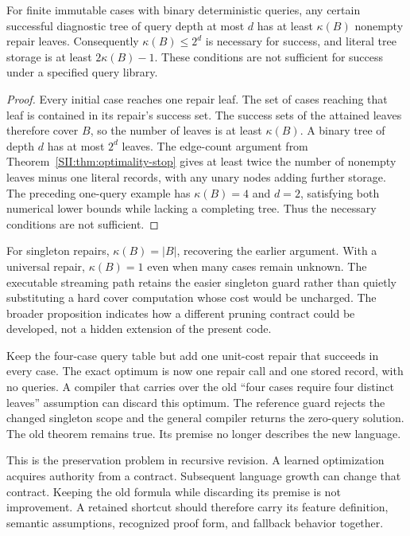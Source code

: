 \begin{SIIproposition}\label{SII:prop:repair-cover}
For finite immutable cases with binary deterministic queries, any certain successful diagnostic tree of query depth at most $d$ has at least $\kappa(B)$ nonempty repair leaves. Consequently $\kappa(B)\leq2^d$ is necessary for success, and literal tree storage is at least $2\kappa(B)-1$. These conditions are not sufficient for success under a specified query library.
\end{SIIproposition}
\begin{proof}
Every initial case reaches one repair leaf. The set of cases reaching that leaf is contained in its repair's success set. The success sets of the attained leaves therefore cover $B$, so the number of leaves is at least $\kappa(B)$. A binary tree of depth $d$ has at most $2^d$ leaves. The edge-count argument from Theorem~\ref{SII:thm:optimality-stop} gives at least twice the number of nonempty leaves minus one literal records, with any unary nodes adding further storage. The preceding one-query example has $\kappa(B)=4$ and $d=2$, satisfying both numerical lower bounds while lacking a completing tree. Thus the necessary conditions are not sufficient.
\end{proof}

For singleton repairs, $\kappa(B)=|B|$, recovering the earlier argument. With a universal repair, $\kappa(B)=1$ even when many cases remain unknown. The executable streaming path retains the easier singleton guard rather than quietly substituting a hard cover computation whose cost would be uncharged. The broader proposition indicates how a different pruning contract could be developed, not a hidden extension of the present code.

\begin{SIIcounterexample}\label{SII:ex:scope-repair-change}
Keep the four-case query table but add one unit-cost repair that succeeds in every case. The exact optimum is now one repair call and one stored record, with no queries. A compiler that carries over the old ``four cases require four distinct leaves'' assumption can discard this optimum. The reference guard rejects the changed singleton scope and the general compiler returns the zero-query solution. The old theorem remains true. Its premise no longer describes the new language.
\end{SIIcounterexample}

This is the preservation problem in recursive revision. A learned optimization acquires authority from a contract. Subsequent language growth can change that contract. Keeping the old formula while discarding its premise is not improvement. A retained shortcut should therefore carry its feature definition, semantic assumptions, recognized proof form, and fallback behavior together.


